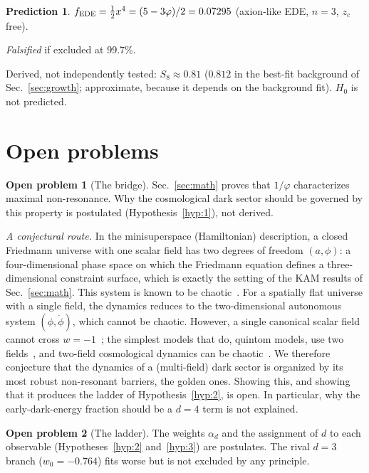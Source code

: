 \documentclass[11pt]{article}
\theoremstyle{definition}
\newtheorem{prediction}{Prediction}
\newtheorem{problem}{Open problem}
\theoremstyle{remark}
\newcommand{\gr}{\varphi}
\newcommand{\fede}{f_{\rm EDE}}
\begin{document}
\begin{prediction}\label{pred:ede}
$\fede = \tfrac12 x^4 = (5 - 3\gr)/2 = 0.07295$ (axion-like EDE, $n = 3$, $z_c$ free).

\emph{Falsified} if excluded at 99.7\%.
\end{prediction}

Derived, not independently tested: $S_8 \approx 0.81$ ($0.812$ in the best-fit background of Sec.~\ref{sec:growth}; approximate, because it depends on the background fit). $H_0$ is not predicted.

\section{Open problems}\label{sec:open}

\begin{problem}[The bridge]
Sec.~\ref{sec:math} proves that $1/\gr$ characterizes maximal non-resonance. Why the cosmological dark sector should be governed by this property is postulated (Hypothesis~\ref{hyp:1}), not derived.

\emph{A conjectural route.} In the minisuperspace (Hamiltonian) description, a closed Friedmann universe with one scalar field has two degrees of freedom $(a, \phi)$: a four-dimensional phase space on which the Friedmann equation defines a three-dimensional constraint surface, which is exactly the setting of the KAM results of Sec.~\ref{sec:math}. This system is known to be chaotic~\cite{Page84,CalzettaElHasi,CornishShellard}. For a spatially flat universe with a single field, the dynamics reduces to the two-dimensional autonomous system $(\phi, \dot\phi)$, which cannot be chaotic. However, a single canonical scalar field cannot cross $w = -1$~\cite{Vikman}; the simplest models that do, quintom models, use two fields~\cite{QuintomReview}, and two-field cosmological dynamics can be chaotic~\cite{EastherMaeda}. We therefore conjecture that the dynamics of a (multi-field) dark sector is organized by its most robust non-resonant barriers, the golden ones. Showing this, and showing that it produces the ladder of Hypothesis~\ref{hyp:2}, is open. In particular, why the early-dark-energy fraction should be a $d = 4$ term is not explained.
\end{problem}

\begin{problem}[The ladder]
The weights $\alpha_d$ and the assignment of $d$ to each observable (Hypotheses~\ref{hyp:2} and~\ref{hyp:3}) are postulates. The rival $d = 3$ branch ($w_0 = -0.764$) fits worse but is not excluded by any principle.
\end{problem}
\end{document}
